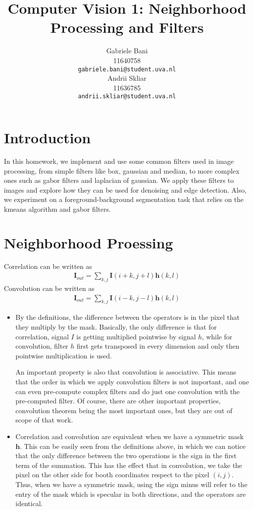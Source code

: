 \documentclass{article}
\title{Computer Vision 1: Neighborhood Processing and Filters}
\author{
	Gabriele Bani \\
	11640758 \\
  \texttt{gabriele.bani@student.uva.nl} \\
  \And
  	Andrii Skliar \\
  11636785 \\
  \texttt{andrii.skliar@student.uva.nl} \\
}
\begin{document}
\maketitle
\section{Introduction}

In this homework, we implement and use some common filters used in image processing, from simple filters like box, gaussian and median, to more complex ones such as gabor filters and laplacian of gaussian. We apply these filters to images and explore how they can be used for denoising and edge detection. Also, we experiment on a foreground-background segmentation task that relies on the kmeans algorithm and gabor filters.

\section{Neighborhood Proessing}

Correlation can be written as
\begin{align*}
    \mathbf{I}_{out} = \sum_{k,j} \mathbf{I}(i+k, j+l)\mathbf{h}(k,l)   
\end{align*}
Convolution can be written as
\begin{align*}
    \mathbf{I}_{out} = \sum_{k,j} \mathbf{I}(i-k, j-l)\mathbf{h}(k,l)
\end{align*}

\begin{itemize}
    \item By the definitions, the difference between the operators is in the pixel that they multiply by the mask. Basically, the only difference is that for correlation, signal $I$ is getting multiplied pointwise by signal $h$, while for convolution, filter $h$ first gets transposed in every dimension and only then pointwise multiplication is used.
    
    An important property is also that convolution is associative. This means that the order in which we apply convolution filters is not important, and one can even pre-compute complex filters and do just one convolution with the pre-computed filter. Of course, there are other important properties, convolution theorem being the most important ones, but they are out of scope of that work.

    \item Correlation and convolution are equivalent when we have a symmetric mask $\mathbf{h}$. This can be easily seen from the definitions above, in which we can notice that the only difference between the two operations is the sign in the first term of the summation. This has the effect that in convolution, we take the pixel on the other side for booth coordinates respect to the pixel $(i,j)$. Thus, when we have a symmetric mask, using the sign minus will refer to the entry of the mask which is specular in both directions, and the operators are identical.
\end{itemize}
\end{document}

